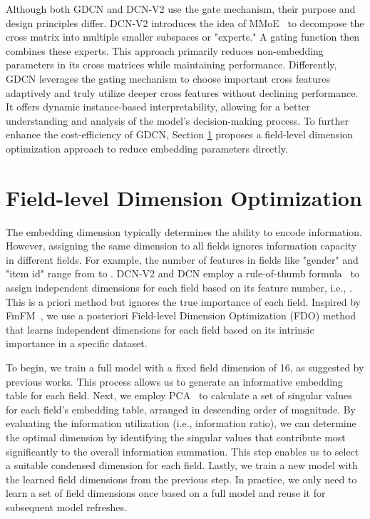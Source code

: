 \documentclass[sigconf]{acmart}
\begin{document}
Although both GDCN and DCN-V2 use the gate mechanism, their purpose and design principles differ. DCN-V2 introduces the idea of MMoE~\cite{ma2018mmoe, shazeer2017outrageously} to decompose the cross matrix into multiple smaller subspaces or "experts." A gating function then combines these experts. This approach primarily reduces non-embedding parameters in its cross matrices while maintaining performance. Differently, GDCN leverages the gating mechanism to choose important cross features adaptively and truly utilize deeper cross features without declining performance. It offers dynamic instance-based interpretability, allowing for a better understanding and analysis of the model's decision-making process. To further enhance the cost-efficiency of GDCN, Section \ref{sec:field dimension optimization} proposes a field-level dimension optimization approach to reduce embedding parameters directly.




\section{Field-level Dimension Optimization}
\label{sec:field dimension optimization}
The embedding dimension typically determines the ability to encode information\cite{zhao2021autodim,sun2021fm2}. However, assigning the same dimension to all fields ignores information capacity in different fields. For example, the number of features in fields like "gender" and "item id" range from  to . DCN-V2 and DCN employ a rule-of-thumb formula~\cite{wang2021dcnm, Tensorflow} to assign independent dimensions for each field based on its feature number, i.e., . This is a priori method but ignores the true importance of each field. Inspired by FmFM~\cite{sun2021fm2}, we use a posteriori Field-level Dimension Optimization (FDO) method that learns independent dimensions for each field based on its intrinsic importance in a specific dataset.



To begin, we train a full model with a fixed field dimension of 16, as suggested by previous works\cite{sun2021fm2, zhu2022bars, zhu2020fuxictr}. This process allows us to generate an informative embedding table for each field. Next, we employ PCA~\cite{abdi2010principal} to calculate a set of singular values for each field's embedding table, arranged in descending order of magnitude. By evaluating the information utilization (i.e., information ratio), we can determine the optimal dimension by identifying the  singular values that contribute most significantly to the overall information summation. This step enables us to select a suitable condensed dimension for each field. Lastly, we train a new model with the learned field dimensions from the previous step. In practice, we only need to learn a set of field dimensions once based on a full model and reuse it for subsequent model refreshes.
\end{document}
